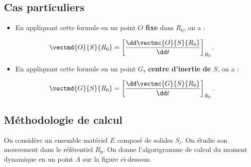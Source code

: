 \subsection{Cas particuliers}

\begin{itemize}
\item En appliquant cette formule en un point \textbf{$O$ fixe} dans $R_0$, on a :

$$
\vectmd{O}{S}{R_0}=\left[\frac{\dd \vectmc{O}{S}{R_0}}{\dd t}\right]_{R_0}.
$$
\item En appliquant cette formule en un point \textbf{$G$, centre d'inertie de $S$}, on a :

$$
\vectmd{G}{S}{R_0}=\left[\frac{\dd \vectmc{G}{S}{R_0}}{\dd t}\right]_{R_0}.
$$

\end{itemize}





\newpage
\subsection{Méthodologie de calcul}

On considère un ensemble matériel $E$ composé de solides $S_i$. On étudie son mouvement dans le référentiel $R_0$.
On donne l'algorigramme de calcul du moment dynamique en un point $A$ sur la figure ci-dessous.%

